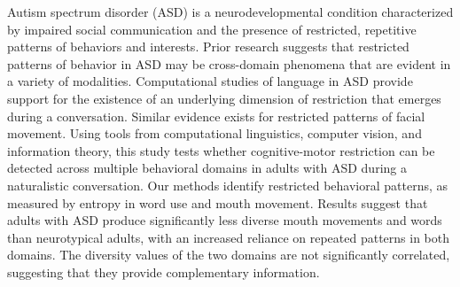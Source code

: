 Autism spectrum disorder (ASD) is a neurodevelopmental condition characterized by impaired social communication and  the presence of restricted, repetitive patterns of behaviors and interests. Prior research suggests that restricted patterns of behavior in ASD may be cross-domain phenomena that are evident in a variety of modalities. Computational studies of language in ASD provide support for the existence of an underlying dimension of restriction that emerges during a conversation. Similar evidence exists for restricted patterns of facial movement. Using tools from computational linguistics, computer vision, and information theory, this study tests whether cognitive-motor restriction can be detected across multiple behavioral domains in adults with ASD during a naturalistic conversation. Our methods identify restricted behavioral patterns, as measured by entropy in word use and mouth movement.  Results suggest that adults with ASD produce significantly less diverse mouth movements and words than neurotypical adults, with an increased reliance on repeated patterns in both domains. The diversity values of the two domains are not significantly correlated, suggesting that they provide complementary information.
